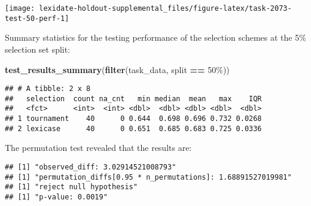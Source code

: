 \documentclass[
]{book}
\newenvironment{Shaded}{\begin{snugshade}}{\end{snugshade}}
\newcommand{\AttributeTok}[1]{\textcolor[rgb]{0.13,0.29,0.53}{#1}}
\newcommand{\DecValTok}[1]{\textcolor[rgb]{0.00,0.00,0.81}{#1}}
\newcommand{\FunctionTok}[1]{\textcolor[rgb]{0.13,0.29,0.53}{\textbf{#1}}}
\newcommand{\NormalTok}[1]{#1}
\newcommand{\OtherTok}[1]{\textcolor[rgb]{0.56,0.35,0.01}{#1}}
\newcommand{\SpecialCharTok}[1]{\textcolor[rgb]{0.81,0.36,0.00}{\textbf{#1}}}
\newcommand{\StringTok}[1]{\textcolor[rgb]{0.31,0.60,0.02}{#1}}
\begin{document}
\texttt{[image: lexidate-holdout-supplemental\_files/figure-latex/task-2073-test-50-perf-1]}

Summary statistics for the testing performance of the selection schemes at the 5\% selection set split:

\begin{Shaded}
\begin{Highlighting}[]
\FunctionTok{test\_results\_summary}\NormalTok{(}\FunctionTok{filter}\NormalTok{(task\_data, split }\SpecialCharTok{==} \StringTok{\textquotesingle{}50\%\textquotesingle{}}\NormalTok{))}
\end{Highlighting}
\end{Shaded}

\begin{verbatim}
## # A tibble: 2 x 8
##   selection  count na_cnt   min median  mean   max    IQR
##   <fct>      <int>  <int> <dbl>  <dbl> <dbl> <dbl>  <dbl>
## 1 tournament    40      0 0.644  0.698 0.696 0.732 0.0268
## 2 lexicase      40      0 0.651  0.685 0.683 0.725 0.0336
\end{verbatim}

The permutation test revealed that the results are:

\begin{Shaded}
\end{Shaded}

\begin{verbatim}
## [1] "observed_diff: 3.02914521008793"
## [1] "permutation_diffs[0.95 * n_permutations]: 1.68891527019981"
## [1] "reject null hypothesis"
## [1] "p-value: 0.0019"
\end{verbatim}
\end{document}
